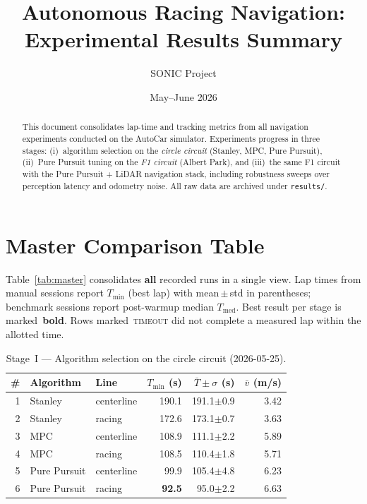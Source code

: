 \documentclass[11pt,a4paper]{article}
\title{Autonomous Racing Navigation:\\Experimental Results Summary}
\author{SONIC Project}
\date{May--June 2026}
\newcommand{\best}[1]{\textbf{#1}}
\newcommand{\fail}{\textsc{timeout}}
\begin{document}
\maketitle

\begin{abstract}
This document consolidates lap-time and tracking metrics from all navigation experiments
conducted on the AutoCar simulator.
Experiments progress in three stages:
(i)~algorithm selection on the \emph{circle circuit} (Stanley, MPC, Pure Pursuit),
(ii)~Pure Pursuit tuning on the \emph{F1 circuit} (Albert Park), and
(iii)~the same F1 circuit with the Pure Pursuit + LiDAR navigation stack,
including robustness sweeps over perception latency and odometry noise.
All raw data are archived under \texttt{results/}.
\end{abstract}
\newpage

\tableofcontents
\newpage

\section{Master Comparison Table}
\label{sec:master}

Table~\ref{tab:master} consolidates \textbf{all} recorded runs in a single view.
Lap times from manual sessions report $T_{\min}$ (best lap) with mean\,$\pm$\,std in
parentheses; benchmark sessions report post-warmup median $T_{\mathrm{med}}$.
Best result per stage is marked~\best{bold}.
Rows marked~\fail{} did not complete a measured lap within the allotted time.

\begin{table}[H]
  \centering
  \caption{Stage~I --- Algorithm selection on the circle circuit (2026-05-25).}
  \label{tab:master-i}
  \small
  \setlength{\tabcolsep}{5pt}
  \begin{tabular}{@{}r l l r r r@{}}
    \toprule
    \# & Algorithm & Line &
    $T_{\min}$ (s) & $\bar{T}\pm\sigma$ (s) & $\bar{v}$ (m/s) \\
    \midrule
    1 & Stanley      & centerline & 190.1 & 191.1$\pm$0.9 & 3.42 \\
    2 & Stanley      & racing     & 172.6 & 173.1$\pm$0.7 & 3.63 \\
    3 & MPC          & centerline & 108.9 & 111.1$\pm$2.2 & 5.89 \\
    4 & MPC          & racing     & 108.5 & 110.4$\pm$1.8 & 5.71 \\
    5 & Pure Pursuit & centerline &  99.9 & 105.4$\pm$4.8 & 6.23 \\
    6 & Pure Pursuit & racing     & \best{92.5} & 95.0$\pm$2.2 & 6.63 \\
    \bottomrule
  \end{tabular}
\end{table}
\end{document}
